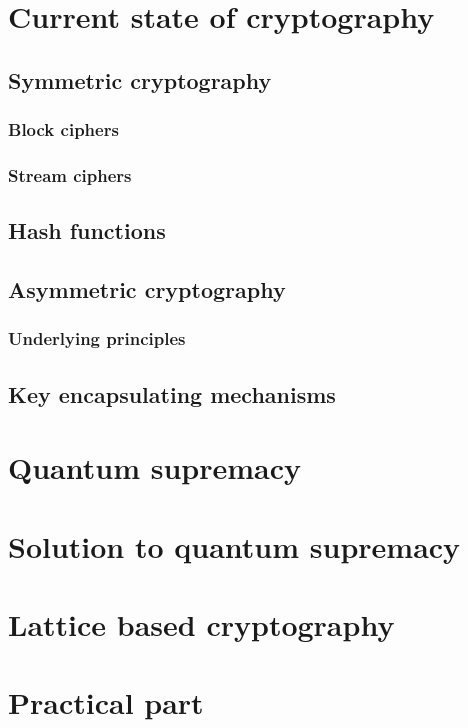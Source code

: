 \chapter{Current state of cryptography}
\label{ch:state_of_crypto}


\section{Symmetric cryptography}
\label{sec:symmetric_enc}


\subsection{Block ciphers}
\label{subsec:block_ciphers}


\subsection{Stream ciphers}
\label{subsec:stream_ciphers}


\section{Hash functions}
\label{sec:hash_functions}


\section{Asymmetric cryptography}
\label{sec:asymmetric_enc}


\subsection{Underlying principles}
\label{subsec:underlying_principles}


\section{Key encapsulating mechanisms}
\label{sec:kem}


\chapter{Quantum supremacy}
\label{chapt:quantum_supr}


\chapter{Solution to quantum supremacy}


\chapter{Lattice based cryptography}


\chapter{Practical part}


